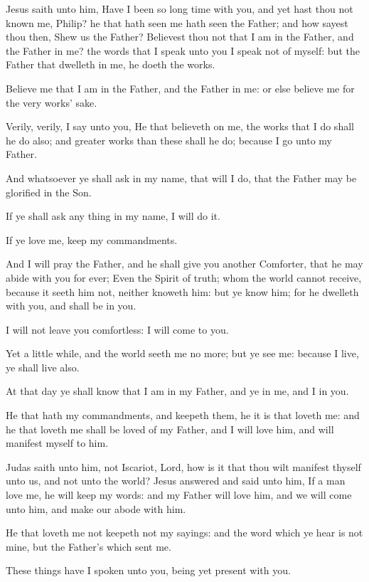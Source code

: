 \verse Jesus saith unto him, Have I been so long time with you, and yet hast thou not known me, Philip? he that hath seen me hath seen the Father; and how sayest thou then, Shew us the Father?  \verse Believest thou not that I am in the Father, and the Father in me?  the words that I speak unto you I speak not of myself: but the Father that dwelleth in me, he doeth the works.

\verse Believe me that I am in the Father, and the Father in me: or else believe me for the very works' sake.

\verse Verily, verily, I say unto you, He that believeth on me, the works that I do shall he do also; and greater works than these shall he do; because I go unto my Father.

\verse And whatsoever ye shall ask in my name, that will I do, that the Father may be glorified in the Son.

\verse If ye shall ask any thing in my name, I will do it.

\verse If ye love me, keep my commandments.

\verse And I will pray the Father, and he shall give you another Comforter, that he may abide with you for ever; \verse Even the Spirit of truth; whom the world cannot receive, because it seeth him not, neither knoweth him: but ye know him; for he dwelleth with you, and shall be in you.

\verse I will not leave you comfortless: I will come to you.

\verse Yet a little while, and the world seeth me no more; but ye see me: because I live, ye shall live also.

\verse At that day ye shall know that I am in my Father, and ye in me, and I in you.

\verse He that hath my commandments, and keepeth them, he it is that loveth me: and he that loveth me shall be loved of my Father, and I will love him, and will manifest myself to him.

\verse Judas saith unto him, not Iscariot, Lord, how is it that thou wilt manifest thyself unto us, and not unto the world?  \verse Jesus answered and said unto him, If a man love me, he will keep my words: and my Father will love him, and we will come unto him, and make our abode with him.

\verse He that loveth me not keepeth not my sayings: and the word which ye hear is not mine, but the Father's which sent me.

\verse These things have I spoken unto you, being yet present with you.

